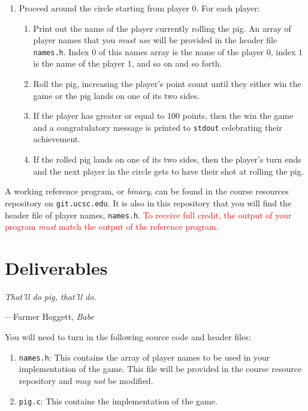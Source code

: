 \documentclass{article}
\begin{document}
\begin{enumerate}
  \item Proceed around the circle starting from player $0$. For each
    player:
    \begin{enumerate}
      \item Print out the name of the player currently rolling the pig.
        An array of player names that you \emph{must use} will be
        provided in the header file \texttt{names.h}. Index $0$ of this
        names array is the name of the player $0$, index $1$ is the name of
        the player $1$, and so on and so forth.
      \item Roll the pig, increasing the player's point count until they
        either win the game or the pig lands on one of its two sides.
      \item If the player has greater or equal to $100$ points, then the
        win the game and a congratulatory message is printed to
        \texttt{stdout} celebrating their achievement.
      \item If the rolled pig lands on one of its two sides, then the
        player's turn ends and the next player in the circle gets to
        have their shot at rolling the pig.
    \end{enumerate}
\end{enumerate}

A working reference program, or \emph{binary}, can be found in the
course resources repository on \texttt{git.ucsc.edu}. It is also in this
repository that you will find the header file of player names,
\texttt{names.h}. \textcolor{red}{To receive full credit, the output of
your program \emph{must} match the output of the reference program.}

\section{Deliverables}
\textwidth
\epigraph{\emph{That'll do pig, that'll do.}}{---Farmer Hoggett, \emph{Babe}}

You will need to turn in the following source code and header files:

\begin{enumerate}
  \item \texttt{names.h}: This contains the array of player names to be
    used in your implementation of the game. This file will be provided
    in the course resource repository and \emph{may not} be modified.
  \item \texttt{pig.c}: This contains the implementation of the game.
\end{enumerate}
\end{document}
